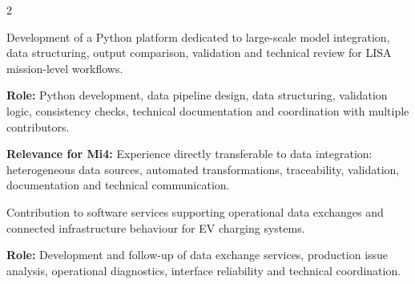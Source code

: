 \documentclass[8pt,a4paper,ragged2e,withhyper]{altacv}
\begin{document}
\begin{paracol}{2}
\medskip



\divider


\divider


\divider




\end{paracol}



Development of a Python platform dedicated to large-scale model integration, data structuring, output comparison, validation and technical review for LISA mission-level workflows.

\textbf{Role:} Python development, data pipeline design, data structuring, validation logic, consistency checks, technical documentation and coordination with multiple contributors.

\textbf{Relevance for Mi4:} Experience directly transferable to data integration: heterogeneous data sources, automated transformations, traceability, validation, documentation and technical communication.

\divider


Contribution to software services supporting operational data exchanges and connected infrastructure behaviour for EV charging systems.

\textbf{Role:} Development and follow-up of data exchange services, production issue analysis, operational diagnostics, interface reliability and technical coordination.
\end{document}
